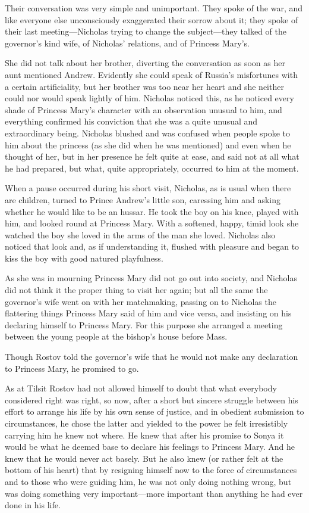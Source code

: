 Their conversation was very simple and unimportant. They spoke of
the war, and like everyone else unconsciously exaggerated their
sorrow about it; they spoke of their last meeting---Nicholas
trying to change the subject---they talked of the governor's kind
wife, of Nicholas' relations, and of Princess Mary's.

She did not talk about her brother, diverting the conversation as
soon as her aunt mentioned Andrew. Evidently she could speak of
Russia's misfortunes with a certain artificiality, but her
brother was too near her heart and she neither could nor would
speak lightly of him. Nicholas noticed this, as he noticed every
shade of Princess Mary's character with an observation unusual to
him, and everything confirmed his conviction that she was a quite
unusual and extraordinary being.  Nicholas blushed and was
confused when people spoke to him about the princess (as she did
when he was mentioned) and even when he thought of her, but in
her presence he felt quite at ease, and said not at all what he
had prepared, but what, quite appropriately, occurred to him at
the moment.

When a pause occurred during his short visit, Nicholas, as is
usual when there are children, turned to Prince Andrew's little
son, caressing him and asking whether he would like to be an
hussar. He took the boy on his knee, played with him, and looked
round at Princess Mary. With a softened, happy, timid look she
watched the boy she loved in the arms of the man she
loved. Nicholas also noticed that look and, as if understanding
it, flushed with pleasure and began to kiss the boy with good
natured playfulness.

As she was in mourning Princess Mary did not go out into society,
and Nicholas did not think it the proper thing to visit her
again; but all the same the governor's wife went on with her
matchmaking, passing on to Nicholas the flattering things
Princess Mary said of him and vice versa, and insisting on his
declaring himself to Princess Mary. For this purpose she arranged
a meeting between the young people at the bishop's house before
Mass.

Though Rostov told the governor's wife that he would not make any
declaration to Princess Mary, he promised to go.

As at Tilsit Rostov had not allowed himself to doubt that what
everybody considered right was right, so now, after a short but
sincere struggle between his effort to arrange his life by his
own sense of justice, and in obedient submission to
circumstances, he chose the latter and yielded to the power he
felt irresistibly carrying him he knew not where. He knew that
after his promise to Sonya it would be what he deemed base to
declare his feelings to Princess Mary. And he knew that he would
never act basely. But he also knew (or rather felt at the bottom
of his heart) that by resigning himself now to the force of
circumstances and to those who were guiding him, he was not only
doing nothing wrong, but was doing something very
important---more important than anything he had ever done in his
life.

